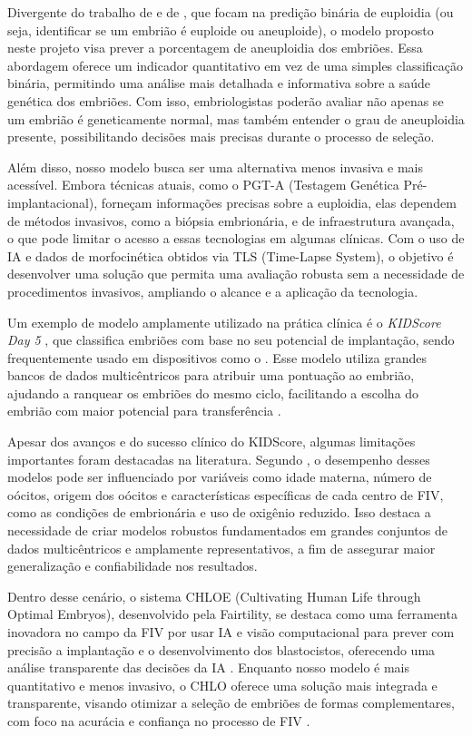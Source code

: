 Divergente do trabalho de  e de , que focam na predição binária de euploidia (ou seja, identificar se um embrião é euploide ou aneuploide), o modelo proposto neste projeto visa prever a porcentagem de aneuploidia dos embriões. Essa abordagem oferece um indicador quantitativo em vez de uma simples classificação binária, permitindo uma análise mais detalhada e informativa sobre a saúde genética dos embriões. Com isso, embriologistas poderão avaliar não apenas se um embrião é geneticamente normal, mas também entender o grau de aneuploidia presente, possibilitando decisões mais precisas durante o processo de seleção.

Além disso, nosso modelo busca ser uma alternativa menos invasiva e mais acessível. Embora técnicas atuais, como o PGT-A (Testagem Genética Pré-implantacional), forneçam informações precisas sobre a euploidia, elas dependem de métodos invasivos, como a biópsia embrionária, e de infraestrutura avançada, o que pode limitar o acesso a essas tecnologias em algumas clínicas. Com o uso de IA e dados de morfocinética obtidos via TLS (Time-Lapse System), o objetivo é desenvolver uma solução que permita uma avaliação robusta sem a necessidade de procedimentos invasivos, ampliando o alcance e a aplicação da tecnologia.

Um exemplo de modelo amplamente utilizado na prática clínica é o \textit{KIDScore\texttrademark{} Day 5} , que classifica embriões com base no seu potencial de implantação, sendo frequentemente usado em dispositivos como o \texttrademark{}\cite{reignier2019}. Esse modelo utiliza grandes bancos de dados multicêntricos para atribuir uma pontuação ao embrião, ajudando a ranquear os embriões do mesmo ciclo, facilitando a escolha do embrião com maior potencial para transferência \cite{reignier2019}.

Apesar dos avanços e do sucesso clínico do KIDScore\texttrademark{}, algumas limitações importantes foram destacadas na literatura. Segundo , o desempenho desses modelos pode ser influenciado por variáveis como idade materna, número de oócitos, origem dos oócitos e características específicas de cada centro de FIV, como as condições de  embrionária e uso de oxigênio reduzido. Isso destaca a necessidade de criar modelos robustos fundamentados em grandes conjuntos de dados multicêntricos e amplamente representativos, a fim de assegurar maior generalização e confiabilidade nos resultados.

Dentro desse cenário, o sistema CHLOE\texttrademark{} (Cultivating Human Life through Optimal Embryos), desenvolvido pela Fairtility\texttrademark{}, se destaca como uma ferramenta inovadora no campo da FIV por usar IA e visão computacional para prever com precisão a implantação e o desenvolvimento dos blastocistos, oferecendo uma análise transparente das decisões da IA \cite{chole}. Enquanto nosso modelo é mais quantitativo e menos invasivo, o CHLO oferece uma solução mais integrada e transparente, visando otimizar a seleção de embriões de formas complementares, com foco na acurácia e confiança no processo de FIV \cite{chole}.

